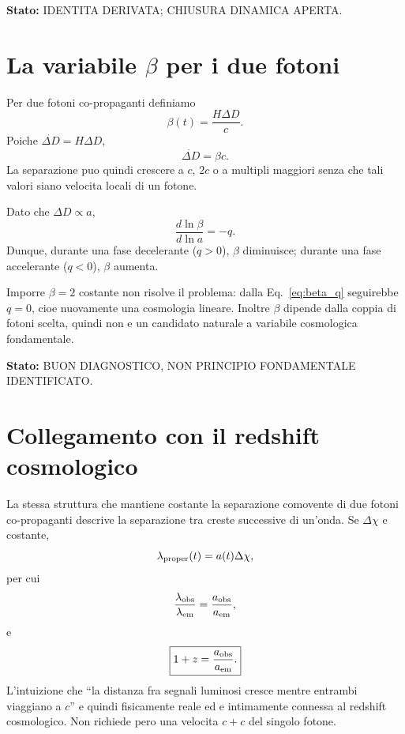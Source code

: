 \documentclass[11pt,a4paper]{article}
\newcommand{\status}[1]{\textsf{#1}}
\begin{document}
\textbf{Stato:} \status{IDENTITA DERIVATA; CHIUSURA DINAMICA APERTA}.

\section{La variabile $\beta$ per i due fotoni}

Per due fotoni co-propaganti definiamo
\begin{equation}
 \beta(t)=\frac{H\Delta D}{c}.
\end{equation}
Poiche $\dot{\Delta D}=H\Delta D$,
\begin{equation}
 \dot{\Delta D}=\beta c.
\end{equation}
La separazione puo quindi crescere a $c$, $2c$ o a multipli maggiori senza che tali valori siano velocita locali di un fotone.

Dato che $\Delta D\propto a$,
\begin{equation}
 \boxed{\frac{d\ln\beta}{d\ln a}=-q.}
 \label{eq:beta_q}
\end{equation}
Dunque, durante una fase decelerante ($q>0$), $\beta$ diminuisce; durante una fase accelerante ($q<0$), $\beta$ aumenta.

Imporre $\beta=2$ costante non risolve il problema: dalla Eq.~\eqref{eq:beta_q} seguirebbe $q=0$, cioe nuovamente una cosmologia lineare. Inoltre $\beta$ dipende dalla coppia di fotoni scelta, quindi non e un candidato naturale a variabile cosmologica fondamentale.

\textbf{Stato:} \status{BUON DIAGNOSTICO, NON PRINCIPIO FONDAMENTALE IDENTIFICATO}.

\section{Collegamento con il redshift cosmologico}

La stessa struttura che mantiene costante la separazione comovente di due fotoni co-propaganti descrive la separazione tra creste successive di un'onda. Se $\Delta\chi$ e costante,
\begin{equation}
 \lambda_{\rm proper}(t)=a(t)\Delta\chi,
\end{equation}
per cui
\begin{equation}
 \frac{\lambda_{\rm obs}}{\lambda_{\rm em}}=\frac{a_{\rm obs}}{a_{\rm em}},
\end{equation}
e
\begin{equation}
 \boxed{1+z=\frac{a_{\rm obs}}{a_{\rm em}}.}
\end{equation}
L'intuizione che ``la distanza fra segnali luminosi cresce mentre entrambi viaggiano a $c$'' e quindi fisicamente reale ed e intimamente connessa al redshift cosmologico. Non richiede pero una velocita $c+c$ del singolo fotone.
\end{document}
